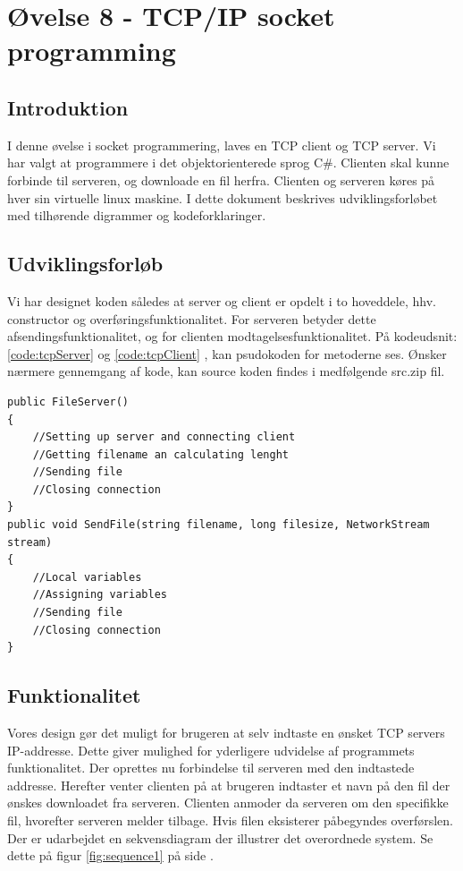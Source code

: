 \section{Øvelse 8 - TCP/IP socket programming}

\subsection{Introduktion}
I denne øvelse i socket programmering, laves en TCP client og TCP server. Vi har valgt at programmere i det objektorienterede sprog C\#. Clienten skal kunne forbinde til serveren, og downloade en fil herfra. Clienten og serveren køres på hver sin virtuelle linux maskine. I dette dokument beskrives udviklingsforløbet med tilhørende digrammer og kodeforklaringer.

\subsection{Udviklingsforløb}
Vi har designet koden således at server og client er opdelt i to hoveddele, hhv. constructor og overføringsfunktionalitet. For serveren betyder dette afsendingsfunktionalitet, og for clienten modtagelsesfunktionalitet. På kodeudsnit: \ref{code:tcpServer}  og \ref{code:tcpClient} , kan psudokoden for metoderne ses. Ønsker nærmere gennemgang af kode, kan source koden findes i medfølgende src.zip fil.

\begin{lstlisting}[caption = Hoveddesign for server,label=code:tcpServer]
public FileServer()
{
	//Setting up server and connecting client
	//Getting filename an calculating lenght
	//Sending file 
	//Closing connection
}
public void SendFile(string filename, long filesize, NetworkStream stream)
{
	//Local variables
	//Assigning variables
	//Sending file
	//Closing connection
}
\end{lstlisting}

\subsection{Funktionalitet}
Vores design gør det muligt for brugeren at selv indtaste en ønsket TCP servers IP-addresse. Dette giver mulighed for yderligere udvidelse af programmets funktionalitet. Der oprettes nu forbindelse til serveren med den indtastede addresse. Herefter venter clienten på at brugeren indtaster et navn på den fil der ønskes downloadet fra serveren. Clienten  anmoder da serveren om den specifikke fil, hvorefter serveren melder tilbage. Hvis filen eksisterer påbegyndes overførslen. Der er udarbejdet en sekvensdiagram der illustrer det overordnede system. Se dette på figur \ref{fig:sequence1} på side \pageref{fig:sequence1}.

